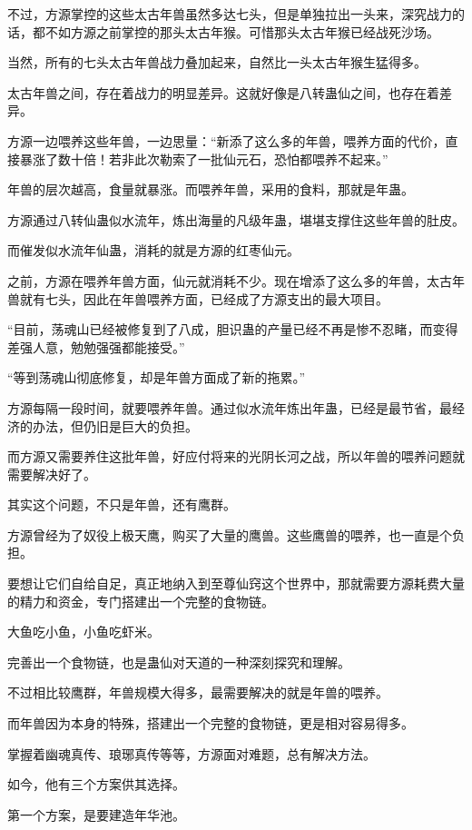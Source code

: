 \begin{this_body}
不过，方源掌控的这些太古年兽虽然多达七头，但是单独拉出一头来，深究战力的话，都不如方源之前掌控的那头太古年猴。可惜那头太古年猴已经战死沙场。

当然，所有的七头太古年兽战力叠加起来，自然比一头太古年猴生猛得多。

太古年兽之间，存在着战力的明显差异。这就好像是八转蛊仙之间，也存在着差异。

方源一边喂养这些年兽，一边思量：“新添了这么多的年兽，喂养方面的代价，直接暴涨了数十倍！若非此次勒索了一批仙元石，恐怕都喂养不起来。”

年兽的层次越高，食量就暴涨。而喂养年兽，采用的食料，那就是年蛊。

方源通过八转仙蛊似水流年，炼出海量的凡级年蛊，堪堪支撑住这些年兽的肚皮。

而催发似水流年仙蛊，消耗的就是方源的红枣仙元。

之前，方源在喂养年兽方面，仙元就消耗不少。现在增添了这么多的年兽，太古年兽就有七头，因此在年兽喂养方面，已经成了方源支出的最大项目。

“目前，荡魂山已经被修复到了八成，胆识蛊的产量已经不再是惨不忍睹，而变得差强人意，勉勉强强都能接受。”

“等到荡魂山彻底修复，却是年兽方面成了新的拖累。”

方源每隔一段时间，就要喂养年兽。通过似水流年炼出年蛊，已经是最节省，最经济的办法，但仍旧是巨大的负担。

而方源又需要养住这批年兽，好应付将来的光阴长河之战，所以年兽的喂养问题就需要解决好了。

其实这个问题，不只是年兽，还有鹰群。

方源曾经为了奴役上极天鹰，购买了大量的鹰兽。这些鹰兽的喂养，也一直是个负担。

要想让它们自给自足，真正地纳入到至尊仙窍这个世界中，那就需要方源耗费大量的精力和资金，专门搭建出一个完整的食物链。

大鱼吃小鱼，小鱼吃虾米。

完善出一个食物链，也是蛊仙对天道的一种深刻探究和理解。

不过相比较鹰群，年兽规模大得多，最需要解决的就是年兽的喂养。

而年兽因为本身的特殊，搭建出一个完整的食物链，更是相对容易得多。

掌握着幽魂真传、琅琊真传等等，方源面对难题，总有解决方法。

如今，他有三个方案供其选择。

第一个方案，是要建造年华池。


\end{this_body}
